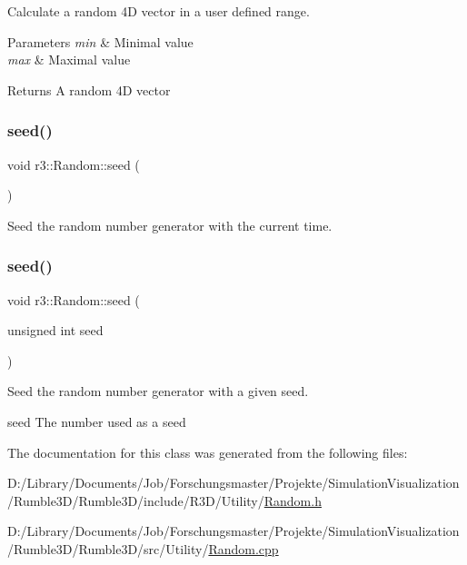 Calculate a random 4D vector in a user defined range. 


\begin{DoxyParams}{Parameters}
{\em min} & Minimal value \\
\hline
{\em max} & Maximal value \\
\hline
\end{DoxyParams}
\begin{DoxyReturn}{Returns}
A random 4D vector 
\end{DoxyReturn}
\mbox{\label{classr3_1_1_random_afa6a47432ea2058f6424618bf77494f2}} 
\subsubsection{\texorpdfstring{seed()}{seed()}\hspace{0.1cm}{\footnotesize\ttfamily [1/2]}}
{\footnotesize\ttfamily void r3\+::\+Random\+::seed (\begin{DoxyParamCaption}{ }\end{DoxyParamCaption})\hspace{0.3cm}{\ttfamily [static]}}



Seed the random number generator with the current time. 

\mbox{\label{classr3_1_1_random_a5fbe1e0d20952af9374f024a24735d80}} 
\subsubsection{\texorpdfstring{seed()}{seed()}\hspace{0.1cm}{\footnotesize\ttfamily [2/2]}}
{\footnotesize\ttfamily void r3\+::\+Random\+::seed (\begin{DoxyParamCaption}\item[{unsigned int}]{seed }\end{DoxyParamCaption})\hspace{0.3cm}{\ttfamily [static]}}



Seed the random number generator with a given seed. 

seed The number used as a seed 

The documentation for this class was generated from the following files\+:\begin{DoxyCompactItemize}
\item 
D\+:/\+Library/\+Documents/\+Job/\+Forschungsmaster/\+Projekte/\+Simulation\+Visualization/\+Rumble3\+D/\+Rumble3\+D/include/\+R3\+D/\+Utility/\mbox{\hyperlink{_random_8h}{Random.\+h}}\item 
D\+:/\+Library/\+Documents/\+Job/\+Forschungsmaster/\+Projekte/\+Simulation\+Visualization/\+Rumble3\+D/\+Rumble3\+D/src/\+Utility/\mbox{\hyperlink{_random_8cpp}{Random.\+cpp}}\end{DoxyCompactItemize}
